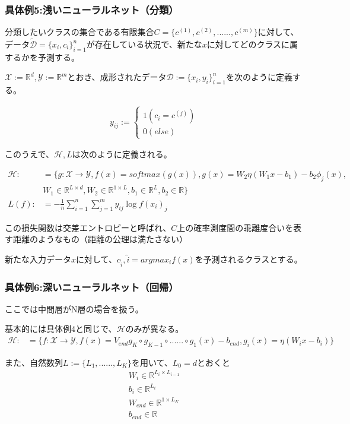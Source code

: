\documentclass{jsarticle}
\begin{document}
\subsubsection{具体例5:浅いニューラルネット（分類）}
分類したいクラスの集合である有限集合$C=\{c^{(1)},c^{(2)},......,c^{(m)}\}$に対して、データ$\tilde{\mathcal{D}}=\{x_i,c_i\}^n_{i=1}$が存在している状況で、新たな$x$に対してどのクラスに属するかを予測する。

$\mathcal{X}:=\mathbb{R}^d,\mathcal{Y}:=\mathbb{R}^m$とおき、成形されたデータ$\mathcal{D}:=\{x_i,y_i\}^n_{i=1}$を次のように定義する。

\begin{align}
y_{ij}:=\begin{cases}
    1(c_i=c^{(j)})\\
    0(else)
\end{cases}
\end{align}

このうえで、$\mathcal{H},L$は次のように定義される。


\begin{align*}
\mathcal{H}:&=\{g:\mathcal{X}\to\mathcal{Y},f(x)=softmax(g(x)),g(x)=W_2\eta(W_1x-b_1)-b_2\phi_j(x),\\ 
&W_1\in\mathbb{R}^{L\times d},W_2\in \mathbb{R}^{1\times L},b_1\in\mathbb{R}^L,b_2\in\mathbb{R}\}\\
L(f):&=-\frac{1}{n}\sum^n_{i=1}\sum^m_{j=1}y_{ij}\log{f(x_i)_j}
\end{align*}

この損失関数は交差エントロピーと呼ばれ、$C$上の確率測度間の乖離度合いを表す距離のようなもの（距離の公理は満たさない）

新たな入力データ$x$に対して、$c_{\hat{i}},\hat{i}=argmax_i f(x)$を予測されるクラスとする。


\subsubsection{具体例6:深いニューラルネット（回帰）}
ここでは中間層がN層の場合を扱う。

基本的には具体例4と同じで、$\mathcal{H}$のみが異なる。
\begin{align}
\mathcal{H}:&=\{f:\mathcal{X}\to\mathcal{Y},f(x)=V_{end}g_K\circ g_{K-1}\circ......\circ g_1(x)-b_{end},g_i(x)=\eta(W_ix-b_i)\}
\end{align}





また、自然数列$L:=\{L_1,......,L_K\}$を用いて、$L_0=d$とおくと
\begin{align}
W_i\in \mathbb{R}^{ L_i\times L_{i-1}}\\
b_i\in \mathbb{R}^{L_i}\\
W_{end}\in\mathbb{R}^{1\times L_K}\\
b_{end}\in\mathbb{R}
\end{align}
\end{document}
